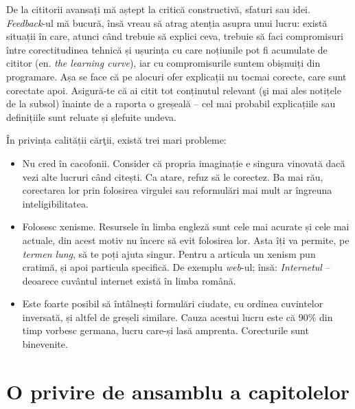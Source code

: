 De la cititorii avansați mă aștept la critică constructivă, sfaturi sau idei.
\textsl{Feedback}-ul mă bucură, însă vreau să atrag atenția asupra unui lucru:
există situații în care, atunci când trebuie să explici ceva, trebuie să
faci compromisuri între corectitudinea tehnică și ușurința cu care noțiunile
pot fi acumulate de cititor (en. \textsl{the learning curve}), iar cu compromisurile
suntem obișnuiți din programare. Așa se face că pe alocuri ofer explicații
nu tocmai corecte, care sunt corectate apoi. Asigură-te că ai citit tot conținutul
relevant (şi mai ales notițele de la subsol) înainte de a raporta o greșeală --
cel mai probabil explicațiile sau definițiile sunt reluate și șlefuite undeva.

În privința calității cărţii, există trei mari probleme:
\begin{itemize}
\item Nu cred în cacofonii. Consider că propria imaginație e singura vinovată
dacă {\glqq}vezi{\grqq} alte lucruri când citești. Ca atare, refuz să le corectez.
Ba mai rău, corectarea lor prin folosirea virgulei sau reformulări mai mult
ar îngreuna inteligibilitatea.
\item Folosesc xenisme. Resursele în limba engleză sunt cele mai acurate și
cele mai actuale, din acest motiv nu încerc să evit folosirea lor.
Asta îți va permite, pe \textit{termen lung}, să te poți ajuta singur. Pentru a
articula un xenism pun cratimă, și apoi particula specifică. De exemplu
\textsl{web}-ul; însă: \textit{Internetul} -- deoarece cuvântul internet există în
limba română.
\item Este foarte posibil să întâlnești formulări ciudate, cu ordinea
cuvintelor inversată, și altfel de greșeli similare. Cauza acestui lucru este că
90\% din timp vorbesc germana, lucru care-și lasă amprenta.
Corecturile sunt binevenite.
\end{itemize}

{}
\section*{O privire de ansamblu a capitolelor}

